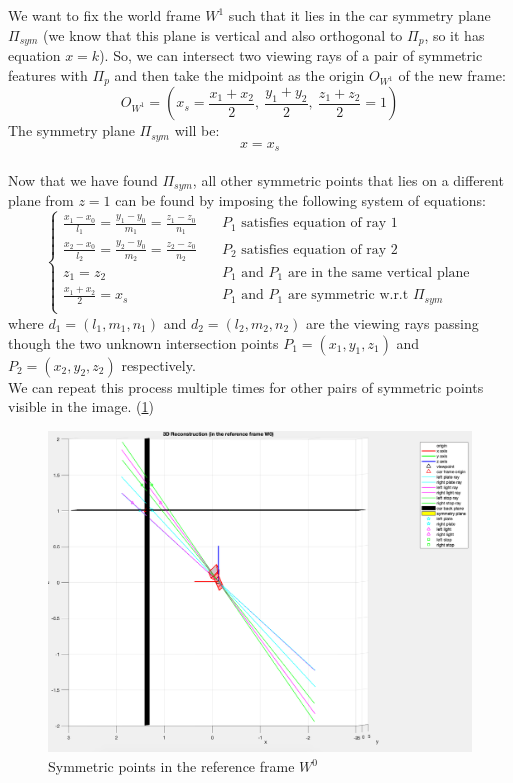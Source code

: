 \documentclass{article}
\begin{document}
We want to fix the world frame $W^1$ such that it lies in the car symmetry plane $\Pi_{sym}$ (we know that this plane is vertical and also orthogonal to $\Pi_p$, so it has equation $x=k$). So, we can intersect two viewing rays of a pair of symmetric features with $\Pi_{p}$ and then take the midpoint as the origin $O_{W^1}$ of the new frame:
$$ O_{W^1} = ( x_s = \frac{x_1+x_2}{2}, \: \frac{y_1+y_2}{2}, \: \frac{z_1+z_2}{2}=1 ) $$
The symmetry plane $\Pi_{sym}$ will be:
$$ x=x_s $$
\\
Now that we have found $\Pi_{sym}$, all other symmetric points that lies on a different plane from $z=1$ can be found by imposing the following system of equations:
$$ \begin{cases}
\frac{x_1-x_0}{l_1} = \frac{y_1-y_0}{m_1} = \frac{z_1-z_0}{n_1} & \quad P_1 \text{ satisfies equation of ray 1} \\
\frac{x_2-x_0}{l_2} = \frac{y_2-y_0}{m_2} = \frac{z_2-z_0}{n_2} & \quad P_2 \text{ satisfies equation of ray 2} \\
z_1 = z_2 & \quad P_1 \text{ and } P_1 \text{ are in the same vertical plane} \\
\frac{x_1 + x_2}{2} = x_s & \quad P_1 \text{ and } P_1 \text{ are symmetric w.r.t } \Pi_{sym} \\
\end{cases} $$
where $d_1 = (l_1, m_1, n_1)$ and $d_2 = (l_2, m_2, n_2)$ are the viewing rays
passing though the two unknown intersection points $P_1 = (x_1, y_1, z_1)$ and $P_2 = (x_2, y_2, z_2)$ respectively.
\\
We can repeat this process multiple times for other pairs of symmetric points visible in the image. (\ref{fig:3dreconstructionW0})
\begin{figure}[hbt!]
\centering
\includegraphics[scale=0.3]{images/3DreconstructionW0.png}
\caption{Symmetric points in the reference frame $W^0$}
\label{fig:3dreconstructionW0}
\end{figure}
\\
\end{document}
